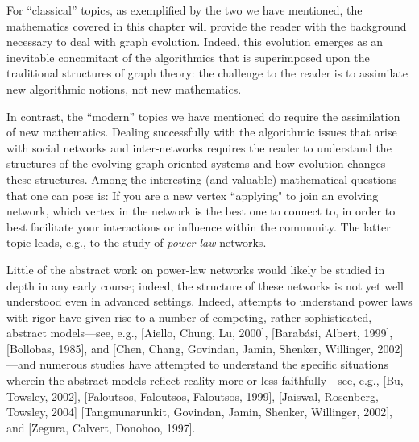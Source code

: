 \smallskip

For ``classical'' topics, as exemplified by the two we have mentioned, the mathematics covered in this chapter will provide the reader with the background necessary to deal with graph evolution.  Indeed, this evolution emerges as an inevitable concomitant of the algorithmics that is superimposed upon the traditional structures of graph theory: the challenge to the reader is to assimilate new algorithmic notions, not new mathematics.

\medskip


In contrast, the ``modern'' topics we have mentioned do require the assimilation of new 
mathematics.  Dealing successfully with the algorithmic issues that arise with social networks and inter-networks requires the reader to understand the structures of the evolving graph-oriented systems and how evolution changes these structures.  Among the interesting (and valuable) mathematical questions that one can pose is: If you are a new vertex ``applying" to join an evolving network, which vertex in the network is the best one to connect to, in order to best facilitate your interactions or influence within the community.  The latter topic leads, e.g., to the study of {\em power-law} networks.


\bigskip

\noindent {}
\bigskip

Little of the abstract work on power-law networks would likely be studied in depth in any early course; indeed, the structure of these networks is not yet well understood even in advanced settings.  Indeed, attempts to understand power laws with rigor have given rise to a number of competing, rather sophisticated, abstract models---see, e.g.,  [Aiello, Chung, Lu, 2000], [Barab\'{a}si, Albert, 1999], [Bollobas, 1985], and [Chen, Chang, Govindan, Jamin, Shenker, Willinger, 2002]---and numerous studies have attempted to understand the specific situations wherein the abstract models reflect reality more or less faithfully---see, e.g.,
[Bu, Towsley, 2002], [Faloutsos, Faloutsos, Faloutsos, 1999], [Jaiswal, Rosenberg, Towsley, 2004] [Tangmunarunkit, Govindan, Jamin, Shenker, Willinger, 2002], and [Zegura, Calvert, Donohoo, 1997].

